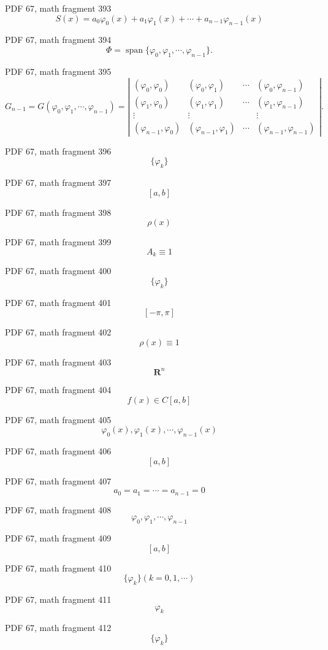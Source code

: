 \documentclass[UTF8,fontset=fandol]{ctexart}
\begin{document}
\par
PDF 67, math fragment 393
\[
S(x) = a_0 \varphi_0(x) + a_1 \varphi_1(x) + \cdots + a_{n-1} \varphi_{n-1}(x)
\]
\par
PDF 67, math fragment 394
\[
\Phi = \operatorname{span}\{\varphi_0, \varphi_1, \cdots, \varphi_{n-1}\}. \tag{3.3.9}
\]
\par
PDF 67, math fragment 395
\[
G_{n-1} = G(\varphi_0, \varphi_1, \cdots, \varphi_{n-1}) = \left| \begin{array}{cccc} (\varphi_0, \varphi_0) & (\varphi_0, \varphi_1) & \cdots & (\varphi_0, \varphi_{n-1}) \\ (\varphi_1, \varphi_0) & (\varphi_1, \varphi_1) & \cdots & (\varphi_1, \varphi_{n-1}) \\ \vdots & \vdots & & \vdots \\ (\varphi_{n-1}, \varphi_0) & (\varphi_{n-1}, \varphi_1) & \cdots & (\varphi_{n-1}, \varphi_{n-1}) \end{array} \right|. \tag{3.3.10}
\]
\par
PDF 67, math fragment 396
\[\{\varphi_k\}\]
\par
PDF 67, math fragment 397
\[[a,b]\]
\par
PDF 67, math fragment 398
\[\rho(x)\]
\par
PDF 67, math fragment 399
\[A_k \equiv 1\]
\par
PDF 67, math fragment 400
\[\{\varphi_k\}\]
\par
PDF 67, math fragment 401
\[[-\pi, \pi]\]
\par
PDF 67, math fragment 402
\[\rho(x) \equiv 1\]
\par
PDF 67, math fragment 403
\[\mathbf{R}^n\]
\par
PDF 67, math fragment 404
\[f(x) \in C[a,b]\]
\par
PDF 67, math fragment 405
\[\varphi_0(x), \varphi_1(x), \cdots, \varphi_{n-1}(x)\]
\par
PDF 67, math fragment 406
\[[a,b]\]
\par
PDF 67, math fragment 407
\[a_0 = a_1 = \cdots = a_{n-1} = 0\]
\par
PDF 67, math fragment 408
\[\varphi_0, \varphi_1, \cdots, \varphi_{n-1}\]
\par
PDF 67, math fragment 409
\[[a,b]\]
\par
PDF 67, math fragment 410
\[\{\varphi_k\} (k=0,1, \cdots)\]
\par
PDF 67, math fragment 411
\[\varphi_k\]
\par
PDF 67, math fragment 412
\[\{\varphi_k\}\]
\end{document}

